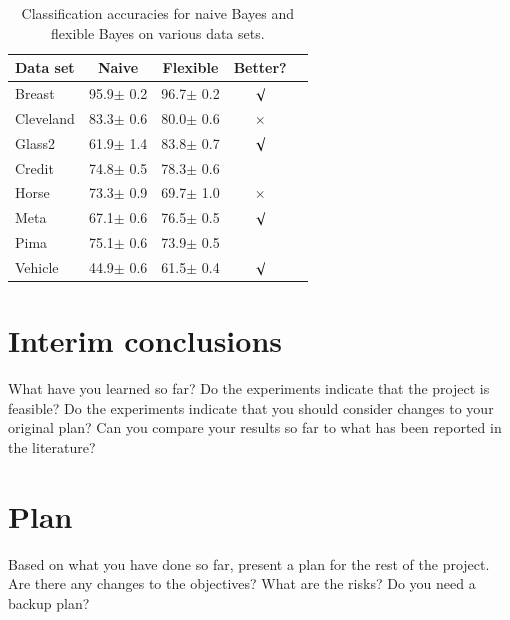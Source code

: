 \documentclass{article}
\begin{document}
\begin{table}[tb]
\vskip 3mm
\begin{center}
\begin{small}
\begin{sc}
\begin{tabular}{lcccr}
\hline
\abovespace\belowspace
Data set & Naive & Flexible & Better? \\
\hline
\abovespace
Breast    & 95.9$\pm$ 0.2& 96.7$\pm$ 0.2& $\surd$ \\
Cleveland & 83.3$\pm$ 0.6& 80.0$\pm$ 0.6& $\times$\\
Glass2    & 61.9$\pm$ 1.4& 83.8$\pm$ 0.7& $\surd$ \\
Credit    & 74.8$\pm$ 0.5& 78.3$\pm$ 0.6&         \\
Horse     & 73.3$\pm$ 0.9& 69.7$\pm$ 1.0& $\times$\\
Meta      & 67.1$\pm$ 0.6& 76.5$\pm$ 0.5& $\surd$ \\
Pima      & 75.1$\pm$ 0.6& 73.9$\pm$ 0.5&         \\
\belowspace
Vehicle   & 44.9$\pm$ 0.6& 61.5$\pm$ 0.4& $\surd$ \\
\hline
\end{tabular}
\end{sc}
\end{small}
\caption{Classification accuracies for naive Bayes and flexible 
Bayes on various data sets.}
\label{tab:sample-table}
\end{center}
\vskip -3mm
\end{table}









\section{Interim conclusions}
\label{sec:concl}
What have you learned so far?  Do the experiments indicate that the project is feasible?  Do the experiments indicate that you should consider changes to your original plan?  Can you compare your results so far to what has been reported in the literature?

\section{Plan}
\label{sec:plan}
Based on what you have done so far, present a plan for the rest of the project.  Are there any changes to the objectives?  What are the risks?  Do you need a backup plan?


\end{document}
